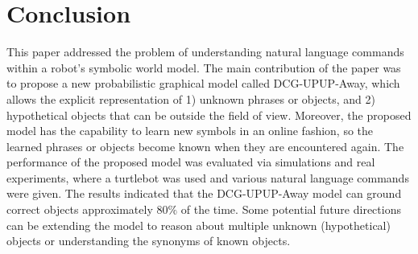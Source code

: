 \section{Conclusion}
\label{sec:conclusion}
This paper addressed the problem of understanding natural language commands within a robot's symbolic world model. The main contribution of the paper was to propose a new probabilistic graphical model called DCG-UPUP-Away, which allows the explicit representation of 1) unknown phrases or objects, and 2) hypothetical objects that can be outside the field of view. Moreover, the proposed model has the capability to learn new symbols in an online fashion, so the learned phrases or objects become known when they are encountered again. The performance of the proposed model was evaluated via simulations and real experiments, where a turtlebot was used and various natural language commands were given. The results indicated that the DCG-UPUP-Away model can ground correct objects approximately $80\%$ of the time. Some potential future directions can be extending the model to reason about multiple unknown (hypothetical) objects or understanding the synonyms of known objects.